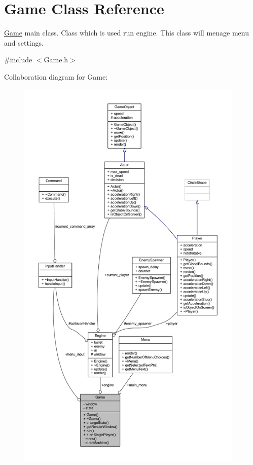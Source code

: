 \hypertarget{class_game}{}\section{Game Class Reference}
\label{class_game}


\hyperlink{class_game}{Game} main class. Class which is used run engine. This class will menage menu and settings.  




{\ttfamily \#include $<$Game.\+h$>$}



Collaboration diagram for Game\+:
\nopagebreak
\begin{figure}[H]
\begin{center}
\leavevmode
\includegraphics[height=550pt]{class_game__coll__graph}
\end{center}
\end{figure}

